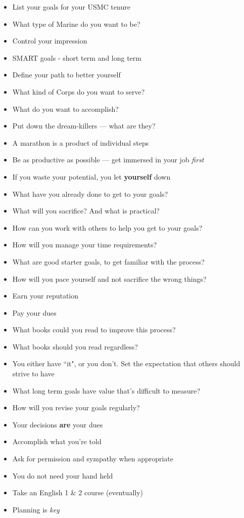 \begin{itemize}
\item{List your goals for your USMC tenure}
\item{What type of Marine do you want to be?}
\item{Control your impression}
\item{SMART goals - short term and long term}
\item{Define your path to better yourself}
\item{What kind of Corps do you want to serve?}
\item{What do you want to accomplish?}
\item{Put down the dream-killers --- what are they?}
\item{A marathon is a product of individual steps}
\item{Be as productive as possible --- get immersed in your job \textit{first}}
\item{If you waste your potential, you let \textbf{yourself} down}
\item{What have you already done to get to your goals?}
\item{What will you sacrifice? And what is practical?}
\item{How can you work with others to help you get to your goals?}
\item{How will you manage your time requirements?}
\item{What are good starter goals, to get familiar with the process?}
\item{How will you pace yourself and not sacrifice the wrong things?}
\item{Earn your reputation}
\item{Pay your dues}
\item{What books could you read to improve this process?}
\item{What books should you read regardless?}
\item{You either have ``it", or you don't. Set the expectation that others should strive to have}
\item{What long term goals have value that's difficult to measure?}
\item{How will you revise your goals regularly?}
\item{Your decisions \textbf{are} your dues}
\item{Accomplish what you're told}
\item{Ask for permission and sympathy when appropriate}
\item{You do not need your hand held}
\item{Take an English 1 \& 2 course (eventually)}
\item{Planning is \textit{key}}
\end{itemize}

